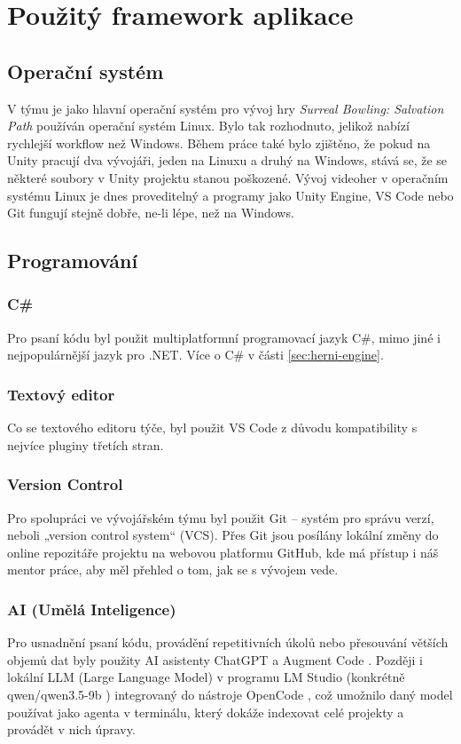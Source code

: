 \chapter{Použitý framework aplikace}

\section{Operační systém}
V týmu je jako hlavní operační systém pro vývoj hry \emph{Surreal Bowling: Salvation Path} používán operační systém Linux. Bylo tak rozhodnuto, jelikož nabízí rychlejší workflow než Windows. Během práce také bylo zjištěno, že pokud na Unity pracují dva vývojáři, jeden na Linuxu a druhý na Windows, stává se, že se některé soubory v Unity projektu stanou poškozené. Vývoj videoher v operačním systému Linux je dnes proveditelný a programy jako Unity Engine, VS Code nebo Git fungují stejně dobře, ne-li lépe, než na Windows. \cite{linux-gamedev}

\section{Programování}

\subsection{C\#}
Pro psaní kódu byl použit multiplatformní programovací jazyk C\#, mimo jiné i nejpopulárnější jazyk pro .NET. \cite{csharp} Více o C\# v části \ref{sec:herni-engine}.

\subsection{Textový editor}
Co se textového editoru týče, byl použit VS Code z důvodu kompatibility s nejvíce pluginy třetích stran. \cite{vscode-vs-codium}

\subsection{Version Control}
Pro spolupráci ve vývojářském týmu byl použit Git – systém pro správu verzí, neboli „version control system“ (VCS). Přes Git jsou posílány lokální změny do online repozitáře projektu na webovou platformu GitHub, kde má přístup i náš mentor práce, aby měl přehled o tom, jak se s vývojem vede. \cite{git-intro} 

\subsection{AI (Umělá Inteligence)}
Pro usnadnění psaní kódu, provádění repetitivních úkolů nebo přesouvání větších objemů dat byly použity AI asistenty ChatGPT \cite{chatgpt} a Augment Code \cite{augment}. Později i lokální LLM (Large Language Model) v programu LM Studio \cite{lmstudio} (konkrétně qwen/qwen3.5-9b \cite{qwen}) integrovaný do nástroje OpenCode \cite{opencode}, což umožnilo daný model používat jako agenta v terminálu, který dokáže indexovat celé projekty a provádět v nich úpravy.

